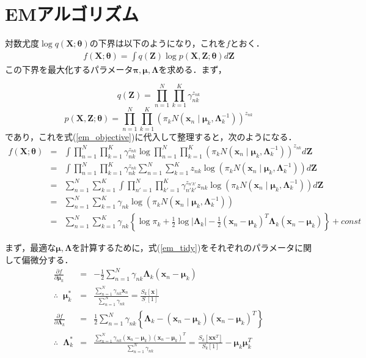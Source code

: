 \documentclass[uplatex]{jsarticle}
\begin{document}
\section{EMアルゴリズム}
対数尤度$\log q(\bm{X}; \bm{\theta})$の下界は以下のようになり，これを$f$とおく．
\begin{eqnarray}
\label{em_objective}
f(\bm{X}; \bm{\theta}) = \int q(\bm{Z})\log p(\bm{X}, \bm{Z}; \bm{\theta}) d\bm{Z}
\end{eqnarray}
この下界を最大化するパラメータ$\bm{\pi}, \bm{\mu}, \bm{\Lambda}$を求める．まず，

$$q(\bm{Z}) = \prod_{n=1}^N \prod_{k=1}^K \gamma_{nk}^{z_{nk}}$$
$$p(\bm{X},  \bm{Z}; \bm{\theta}) = \prod_{n=1}^N \prod_{k=1}^K (\pi_k N(\bm{x}_n \mid \bm{\mu}_k, \bm{\Lambda}_k^{-1}))^{z_{nk}}$$
であり，これを式(\ref{em_objective})に代入して整理すると，次のようになる．
\begin{eqnarray}
\label{em_tidy}
f(\bm{X}; \bm{\theta}) &=& \int \prod_{n=1}^N \prod_{k=1}^K \gamma_{nk}^{z_{nk}} \log \prod_{n=1}^N \prod_{k=1}^K (\pi_k N(\bm{x}_n \mid \bm{\mu}_k, \bm{\Lambda}_k^{-1}))^{z_{nk}} d\bm{Z} \nonumber \\
&=& \int \prod_{n=1}^N \prod_{k=1}^K \gamma_{nk}^{z_{nk}} \sum_{n=1}^N \sum_{k=1}^K z_{nk} \log (\pi_k N(\bm{x}_n \mid \bm{\mu}_k, \bm{\Lambda}_k^{-1})) d\bm{Z} \nonumber \\
&=& \sum_{n=1}^N \sum_{k=1}^K \int \prod_{n'=1}^N \prod_{k'=1}^K \gamma_{n'k'}^{z_{n'k'}} z_{nk} \log (\pi_k N(\bm{x}_n \mid \bm{\mu}_k, \bm{\Lambda}_k^{-1})) d\bm{Z} \nonumber \\
&=& \sum_{n=1}^N \sum_{k=1}^K \gamma_{nk} \log (\pi_k N(\bm{x}_n \mid \bm{\mu}_k, \bm{\Lambda}_k^{-1})) \nonumber \\
&=& \sum_{n=1}^N \sum_{k=1}^K \gamma_{nk} \left\{ \log \pi_k + \frac{1}{2}\log |\bm{\Lambda}_k| - \frac{1}{2}(\bm{x}_{n} - \bm{\mu}_k)^T\bm{\Lambda}_k(\bm{x}_{n} - \bm{\mu}_k) \right\} + const
\end{eqnarray}

まず，最適な$\bm{\mu}, \bm{\Lambda}$を計算するために，式(\ref{em_tidy})をそれぞれのパラメータに関して偏微分する．
\begin{eqnarray*}
\frac{\partial f}{\partial \bm{\mu}_k} &=& - \frac{1}{2} \sum_{n=1}^N \gamma_{nk} \bm{\Lambda}_k(\bm{x}_{n} - \bm{\mu}_k) \nonumber \\
\therefore \; \; \bm{\mu}_k^*  &=& \frac{\sum_{n=1}^N \gamma_{nk} \bm{x}_n}{\sum_{n=1}^N \gamma_{nk}} = \frac{S_k\left[\bm{x}\right]}{S_{.}\left[1\right]} \nonumber \\
\frac{\partial f}{\partial \bm{\Lambda}_k} &=& \frac{1}{2} \sum_{n=1}^N \gamma_{nk} \left\{\bm{\Lambda}_k - (\bm{x}_n - \bm{\mu}_k)(\bm{x}_n - \bm{\mu}_k)^T\right\} \\
\therefore \; \; \bm{\Lambda}_k^* &=& \frac{\sum_{n=1}^N \gamma_{nk} (\bm{x}_n - \bm{\mu}_k)(\bm{x}_n - \bm{\mu}_k)^T}{\sum_{n=1}^N \gamma_{nk}} = \frac{S_k\left[\bm{x}\bm{x}^T\right]}{S_k[1]} - \bm{\mu}_k\bm{\mu}_k^T 
\end{eqnarray*}
\end{document}
